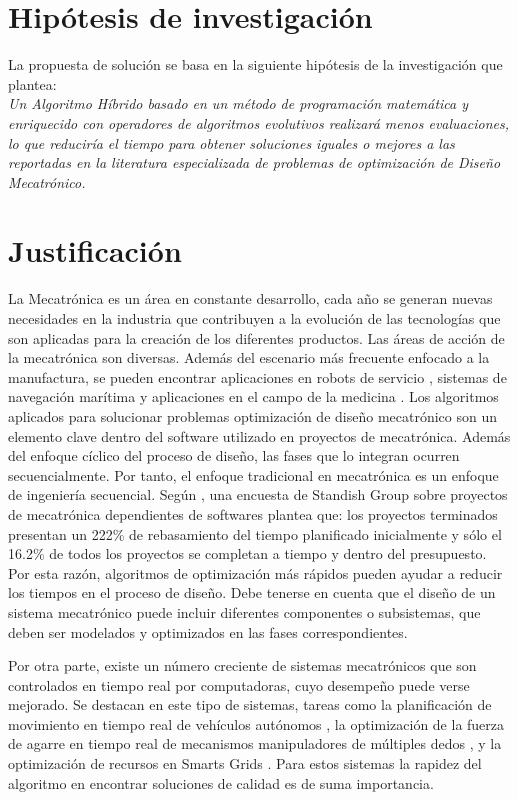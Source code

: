   \section{Hipótesis de investigación}
  La propuesta de solución se basa en la siguiente hipótesis de la investigación que plantea:\\
\textit{  Un Algoritmo Híbrido basado en un método de programación matemática y enriquecido con operadores de algoritmos evolutivos realizará menos evaluaciones, lo que reduciría el tiempo para obtener soluciones iguales o mejores a las reportadas en la literatura especializada de problemas de optimización de Diseño Mecatrónico.}
  
  \section{Justificación}
  
  La Mecatrónica es un área en constante desarrollo, cada año se generan nuevas necesidades en la industria que contribuyen a la evolución de las tecnologías que son aplicadas para la creación de los diferentes productos. Las áreas de acción de la mecatrónica son diversas. Además del escenario más frecuente enfocado a la manufactura, se pueden encontrar aplicaciones en robots de servicio  \cite{munaro2014fast} \cite{jiang2015novel}, sistemas de navegación marítima \cite{shi2017advanced}  y aplicaciones en el campo de la medicina \cite{burgner2015continuum}. Los algoritmos aplicados para solucionar problemas optimización de diseño mecatrónico son un elemento clave dentro del software utilizado en proyectos de mecatrónica. Además del enfoque cíclico del proceso de diseño, las fases que lo integran ocurren secuencialmente. Por tanto, el enfoque tradicional en mecatrónica es un enfoque de ingeniería secuencial. Según \cite{shetty_mechatronics_2010}, una encuesta de Standish Group sobre proyectos de mecatrónica dependientes de softwares plantea que: los proyectos terminados presentan un 222\% de rebasamiento del tiempo planificado inicialmente y sólo el 16.2\% de todos los proyectos se completan a tiempo y dentro del presupuesto. Por esta razón, algoritmos de optimización más rápidos pueden ayudar a reducir los tiempos en el proceso de diseño. Debe tenerse en cuenta que el diseño de un sistema mecatrónico puede incluir diferentes componentes o subsistemas, que deben ser modelados y optimizados en las fases correspondientes.
  
  Por otra parte, existe un número creciente de sistemas mecatrónicos que son controlados en tiempo real por computadoras, cuyo desempeño puede verse mejorado. Se destacan en este tipo de sistemas, tareas como la planificación de movimiento en tiempo real de vehículos autónomos \cite{frazzoli_real-time_2002},  la optimización de la fuerza de agarre en tiempo real  de mecanismos manipuladores de múltiples dedos \cite{liu_real-time_2004}, y la optimización de recursos en Smarts Grids \cite{kumar2017smart} \cite{ahat2013smart} \cite{mortaji2016smart}. Para estos sistemas la rapidez del algoritmo en encontrar soluciones de calidad es de suma importancia.
  
